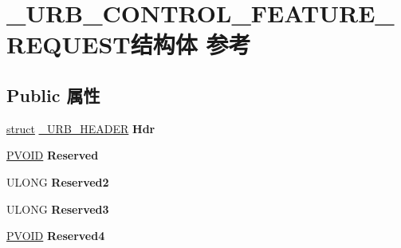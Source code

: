 \hypertarget{struct___u_r_b___c_o_n_t_r_o_l___f_e_a_t_u_r_e___r_e_q_u_e_s_t}{}\section{\+\_\+\+U\+R\+B\+\_\+\+C\+O\+N\+T\+R\+O\+L\+\_\+\+F\+E\+A\+T\+U\+R\+E\+\_\+\+R\+E\+Q\+U\+E\+S\+T结构体 参考}
\label{struct___u_r_b___c_o_n_t_r_o_l___f_e_a_t_u_r_e___r_e_q_u_e_s_t}
\subsection*{Public 属性}
\begin{DoxyCompactItemize}
\item 
\mbox{\label{struct___u_r_b___c_o_n_t_r_o_l___f_e_a_t_u_r_e___r_e_q_u_e_s_t_a8b04e2bce37a263d4b3071370dc55993}} 
\hyperlink{interfacestruct}{struct} \hyperlink{struct___u_r_b___h_e_a_d_e_r}{\+\_\+\+U\+R\+B\+\_\+\+H\+E\+A\+D\+ER} {\bfseries Hdr}
\item 
\mbox{\label{struct___u_r_b___c_o_n_t_r_o_l___f_e_a_t_u_r_e___r_e_q_u_e_s_t_ac4134e440a9a9d6400d5b1a3adba2e2b}} 
\hyperlink{interfacevoid}{P\+V\+O\+ID} {\bfseries Reserved}
\item 
\mbox{\label{struct___u_r_b___c_o_n_t_r_o_l___f_e_a_t_u_r_e___r_e_q_u_e_s_t_a2f960baaa1b5549188dddfa0d8610802}} 
U\+L\+O\+NG {\bfseries Reserved2}
\item 
\mbox{\label{struct___u_r_b___c_o_n_t_r_o_l___f_e_a_t_u_r_e___r_e_q_u_e_s_t_a6052fc19705c3ab7213fd4a6aeb09dec}} 
U\+L\+O\+NG {\bfseries Reserved3}
\item 
\mbox{\label{struct___u_r_b___c_o_n_t_r_o_l___f_e_a_t_u_r_e___r_e_q_u_e_s_t_a9d089b817cd75b7096c24089b62c899f}} 
\hyperlink{interfacevoid}{P\+V\+O\+ID} {\bfseries Reserved4}
\item 
\mbox{\label{struct___u_r_b___c_o_n_t_r_o_l___f_e_a_t_u_r_e___r_e_q_u_e_s_t_aabfa4e9ad20175044cf36eaad56aeaf1}} 

\end{DoxyCompactItemize}

